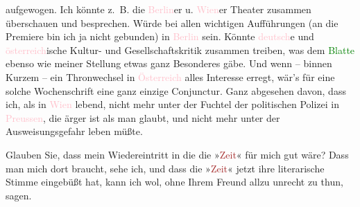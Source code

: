                aufgewogen. Ich könnte z. B. die \textcolor{pink}{Berlin}{}\ledrightnote{\textcolor{pink}{Berlin}}er u. \textcolor{pink}{Wien}{}\ledrightnote{\textcolor{pink}{Wien}}er Theater zusammen überschauen und besprechen.
               Würde bei allen wichtigen Aufführungen (an die Premiere bin ich ja nicht gebunden) in
                  \textcolor{pink}{Berlin}{}\ledrightnote{\textcolor{pink}{Berlin}} sein. Könnte \textcolor{pink}{deutsch}{}\ledrightnote{{$\rightarrow$}\textcolor{pink}{Deutschland}}e und \textcolor{pink}{österreich}{}\ledrightnote{{$\rightarrow$}\textcolor{pink}{Österreich}}ische Kultur- und
               Gesellschaftskritik zusammen treiben, was dem \textcolor{brown}{\textcolor{green}{Blatte}{}\ledrightnote{{$\rightarrow$}\textcolor{green}{Morgen. Wochenschrift für deutsche Kultur}}}{}\ledrightnote{\textcolor{brown}{Morgen. Wochenschrift für deutsche Kultur}} ebenso wie meiner Stellung etwas ganz Besonderes gäbe. Und wenn – binnen Kurzem
               – ein Thronwechsel in \textcolor{pink}{Österreich}{}\ledrightnote{\textcolor{pink}{Österreich}} alles
               Interesse erregt, wär’s für eine solche Wochenschrift eine ganz einzige Conjunctur.
               Ganz abgesehen davon, dass ich, als in \textcolor{pink}{Wien}{}\ledrightnote{\textcolor{pink}{Wien}}
               lebend, nicht mehr unter der Fuchtel der politischen Polizei in \textcolor{pink}{Preussen}{}\ledrightnote{\textcolor{pink}{Preußen}}, die ärger ist als man glaubt, und nicht mehr unter
               der Ausweisungsgefahr leben müßte.\pend
           
\pstart
           Glauben Sie, dass mein Wiedereintritt in die die »\textcolor{brown}{Zeit}{}\ledrightnote{\textcolor{brown}{Die Zeit}}« für mich gut wäre? Dass man mich dort braucht, sehe ich, und dass die
                  »\textcolor{brown}{Zeit}{}\ledrightnote{\textcolor{brown}{Die Zeit}}« jetzt ihre literarische Stimme
               eingebüßt hat, kann ich wol, ohne Ihrem Freund \label{K_L03430-4v}\label{K_L03430-4h} allzu unrecht zu thun, sagen.\pend
           
